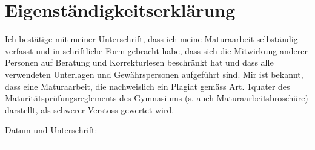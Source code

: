 \chapter*{Eigenständigkeitserklärung}\label{cha:eigenständigkeitserklärung}
Ich bestätige mit meiner Unterschrift, dass ich meine Maturaarbeit selbständig verfasst und in schriftliche Form gebracht habe, dass sich die Mitwirkung anderer Personen auf Beratung und Korrekturlesen beschränkt hat und dass alle verwendeten Unterlagen und Gewährspersonen aufgeführt sind. Mir ist bekannt, dass eine Maturaarbeit, die nachweislich ein Plagiat gemäss Art. 1quater des Maturitätsprüfungsreglements des Gymnasiums (s. auch Maturaarbeitsbroschüre) darstellt, als schwerer Verstoss gewertet wird.
\vspace{1.5cm}

\noindent Datum und Unterschrift: \rule[-2mm]{11cm}{0.4pt} 